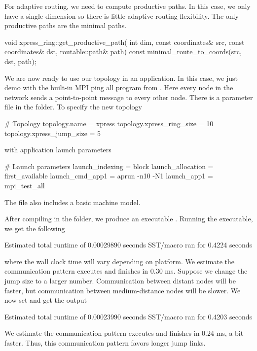 For adaptive routing, we need to compute productive paths.
In this case, we only have a single dimension so there is little adaptive routing flexibility.
The only productive paths are the minimal paths.

\begin{CppCode}
void xpress_ring::get_productive_path(
  int dim,
  const coordinates& src,
  const coordinates& dst,
  routable::path& path) const
{
  minimal_route_to_coords(src, dst, path);
}
\end{CppCode}

We are now ready to use our topology in an application.
In this case, we just demo with the built-in MPI ping all program from \sstmacro.
Here every node in the network sends a point-to-point message to every other node.
There is a parameter file in the  folder.
To specify the new topology

\begin{ViFile}
# Topology
topology.name = xpress
topology.xpress_ring_size = 10
topology.xpress_jump_size = 5
\end{ViFile}
with application launch parameters

\begin{ViFile}
# Launch parameters
launch_indexing = block
launch_allocation = first_available
launch_cmd_app1 = aprun -n10 -N1
launch_app1 = mpi_test_all
\end{ViFile}
The file also includes a basic machine model.

After compiling in the folder, we produce an executable .
Running the executable, we get the following

\begin{ShellCmd}
Estimated total runtime of           0.00029890 seconds
SST/macro ran for       0.4224 seconds
\end{ShellCmd}
where the \sstmacro wall clock time will vary depending on platform.
We estimate the communication pattern executes and finishes in 0.30 ms.
Suppose we change the jump size to a larger number.
Communication between distant nodes will be faster, but communication between medium-distance nodes will be slower.
We now set  and get the output

\begin{ShellCmd}
Estimated total runtime of           0.00023990 seconds
SST/macro ran for       0.4203 seconds
\end{ShellCmd}
We estimate the communication pattern executes and finishes in 0.24 ms, a bit faster.
Thus, this communication pattern favors longer jump links.


